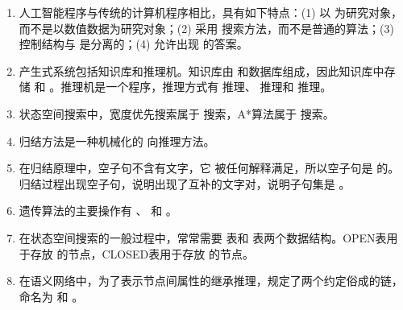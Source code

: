 \begin{enumerate}[leftmargin=2em,itemsep=1pt]
\item 人工智能程序与传统的计算机程序相比，具有如下特点：(1) 以 \underline{\hspace{4em}} 为研究对象，而不是以数值数据为研究对象；(2) 采用 \underline{\hspace{4em}} 搜索方法，而不是普通的算法；(3) 控制结构与 \underline{\hspace{4em}} 是分离的；(4) 允许出现 \underline{\hspace{4em}} 的答案。
\item 产生式系统包括知识库和推理机。知识库由 \underline{\hspace{4em}} 和数据库组成，因此知识库中存储 \underline{\hspace{4em}} 和 \underline{\hspace{4em}}。推理机是一个程序，推理方式有 \underline{\hspace{4em}} 推理、 \underline{\hspace{4em}} 推理和 \underline{\hspace{4em}} 推理。
\item 状态空间搜索中，宽度优先搜索属于 \underline{\hspace{4em}} 搜索，A*算法属于 \underline{\hspace{4em}} 搜索。
\item 归结方法是一种机械化的 \underline{\hspace{4em}} 向推理方法。
\item 在归结原理中，空子句不含有文字，它 \underline{\hspace{4em}} 被任何解释满足，所以空子句是 \underline{\hspace{4em}} 的。归结过程出现空子句，说明出现了互补的文字对，说明子句集是 \underline{\hspace{4em}}。
\item 遗传算法的主要操作有 \underline{\hspace{4em}}、\underline{\hspace{4em}} 和 \underline{\hspace{4em}}。
\item 在状态空间搜索的一般过程中，常常需要 \underline{\hspace{4em}} 表和 \underline{\hspace{4em}} 表两个数据结构。OPEN表用于存放 \underline{\hspace{4em}} 的节点，CLOSED表用于存放 \underline{\hspace{4em}} 的节点。
\item 在语义网络中，为了表示节点间属性的继承推理，规定了两个约定俗成的链，命名为 \underline{\hspace{4em}} 和 \underline{\hspace{4em}}。

\end{enumerate}
